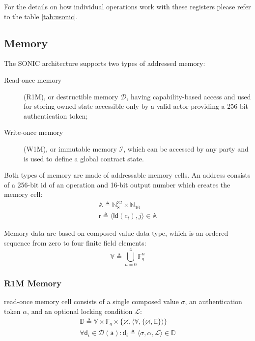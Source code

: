 \documentclass[9pt,oneside]{amsart}
\begin{document}
\begin{multicols}{2}
For the details on how individual operations work with these registers
please refer to the table \ref{tab:usonic}.

\subsection{Memory}\label{Memory}

The SONIC architecture supports two types of addressed memory:
\begin{description}
\item[Read-once memory] (R1M), or \gls{destructible memory} $\mathcal{D}$,
    having capability-based access and used for storing \gls{owned state}
    accessible only by a valid actor providing a 256-bit \gls{authentication token};

\item[Write-once memory] (W1M), or \gls{immutable memory} $\mathcal{I}$,
    which can be accessed by any party and is used to define a global contract state.
\end{description}

Both types of memory are made of addressable memory cells.
An address consists of a 256-bit id of an operation and 16-bit output number
which creates the memory cell:
\noindent
\begin{gather}
\mathbb{A} \triangleq \mathbb{N}^{32}_8 \times \mathbb{N}_{16} \\
\mathsf{r} \triangleq \langle \mathsf{Id}(c_i), j \rangle \in \mathbb{A}
\end{gather}

Memory data are based on \gls{composed value} data type,
which is an ordered sequence from zero to four finite field elements:
\noindent
\begin{equation}
\mathbb{V} \triangleq \bigcup_{n=0}^{4} \mathbb{F}_q^n
\end{equation}

\subsubsection{R1M Memory}\label{R1M}

\Gls{read-once memory} cell consists of a single \gls{composed value} $\sigma$,
an \gls{authentication token} $\alpha$, and an optional \gls{locking condition} $\mathcal{L}$:
\noindent
\begin{gather}
\mathbb{D} \triangleq \mathbb{V} \times \mathbb{F}_q \times \{ \varnothing, \langle \mathbb{V}, \{ \varnothing, \mathbb{E} \} \rangle \} \\
\forall \mathsf{d}_i \in \mathcal{D}(\mathsf{a}) : \mathsf{d}_i \triangleq \langle \sigma, \alpha, \mathcal{L} \rangle \in \mathbb{D}
\end{gather}


\end{multicols}
\end{document}
